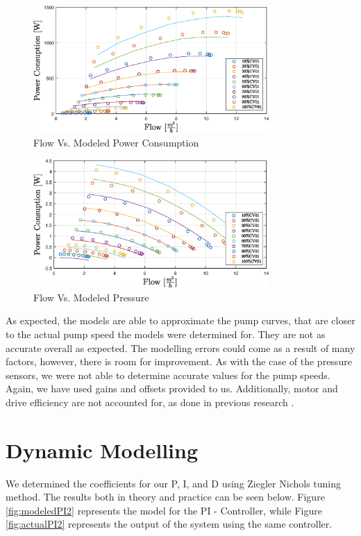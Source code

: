 \begin{figure}[ht]
	\centering
	\includegraphics[width=0.8\textwidth]{figures/06ModelValidation/flowVsModeledPowerConsumption.eps}
	\caption{Flow Vs. Modeled Power Consumption}
	\label{fig:flowVsModeledPower}
\end{figure}
\begin{figure}[ht]
	\centering
	\includegraphics[width=0.8\textwidth]{figures/06ModelValidation/flowVsModeledPressure.eps}
	\caption{Flow Vs. Modeled Pressure}
	\label{fig:flowVsModeledPressure}
\end{figure}

As expected, the models are able to approximate the pump curves, that are closer to the actual pump speed the models were determined for.
They are not as accurate overall as expected. 
The modelling errors could come as a result of many factors, however, there is room for improvement. 
As with the case of the pressure sensors,
we were not able to determine accurate values for the pump speeds.
Again, we have used gains and offsets provided to us.
Additionally, motor and drive efficiency are not accounted for,
as done in previous research \cite{Yang2010}.

\section{Dynamic Modelling}
We determined the coefficients for our P, I, and D using Ziegler Nichols tuning method.
The results both in theory and practice can be seen below. Figure \ref{fig:modeledPI2} represents the model for the PI -
Controller, while Figure \ref{fig:actualPI2} represents the output of the system using the same controller.

